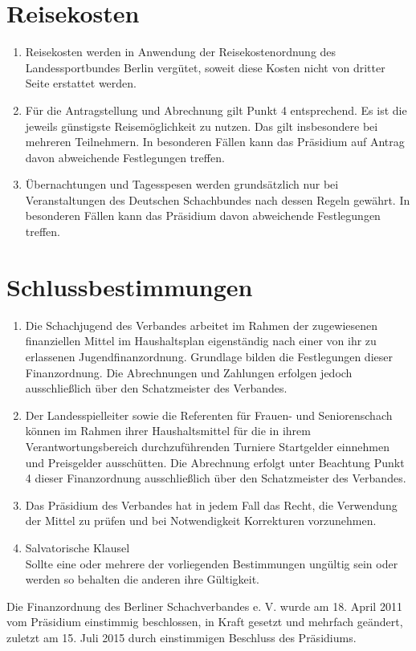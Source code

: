\documentclass[fontsize=12pt, paper=a4, ngerman]{article}
\begin{document}
\section{Reisekosten}
\begin{enumerate}
  \item Reisekosten werden in Anwendung der Reisekostenordnung des Landessportbundes
  Berlin vergütet, soweit diese Kosten nicht von dritter Seite erstattet werden.
  \item Für die Antragstellung und Abrechnung gilt Punkt 4 entsprechend. Es ist die jeweils
  günstigste Reisemöglichkeit zu nutzen. Das gilt insbesondere bei mehreren Teilnehmern.
  In besonderen Fällen kann das Präsidium auf Antrag davon abweichende Festlegungen treffen.
  \item Übernachtungen und Tagesspesen werden grundsätzlich nur bei Veranstaltungen des
  Deutschen Schachbundes nach dessen Regeln gewährt. In besonderen Fällen kann das
  Präsidium davon abweichende Festlegungen treffen.
\end{enumerate}

\section{Schlussbestimmungen}
\begin{enumerate}
  \item Die Schachjugend des Verbandes arbeitet im Rahmen der zugewiesenen finanziellen
  Mittel im Haushaltsplan eigenständig nach einer von ihr zu erlassenen
  Jugendfinanzordnung. Grundlage bilden die Festlegungen dieser Finanzordnung. Die
  Abrechnungen und Zahlungen erfolgen jedoch ausschließlich über den Schatzmeister des
  Verbandes.
  \item Der Landesspielleiter sowie die Referenten für Frauen- und Seniorenschach können im
  Rahmen ihrer Haushaltsmittel für die in ihrem Verantwortungsbereich durchzuführenden
  Turniere Startgelder einnehmen und Preisgelder ausschütten. Die Abrechnung erfolgt unter
  Beachtung Punkt 4 dieser Finanzordnung ausschließlich über den Schatzmeister des Verbandes.
  \item Das Präsidium des Verbandes hat in jedem Fall das Recht, die Verwendung der Mittel
  zu prüfen und bei Notwendigkeit Korrekturen vorzunehmen.
  \item Salvatorische Klausel \\
  Sollte eine oder mehrere der vorliegenden Bestimmungen ungültig sein oder werden so
  behalten die anderen ihre Gültigkeit.
\end{enumerate}

Die Finanzordnung des Berliner Schachverbandes e. V. wurde am 18. April 2011 vom Präsidium
einstimmig beschlossen, in Kraft gesetzt und mehrfach geändert, zuletzt am 15. Juli 2015 durch einstimmigen Beschluss des Präsidiums.
\end{document}
